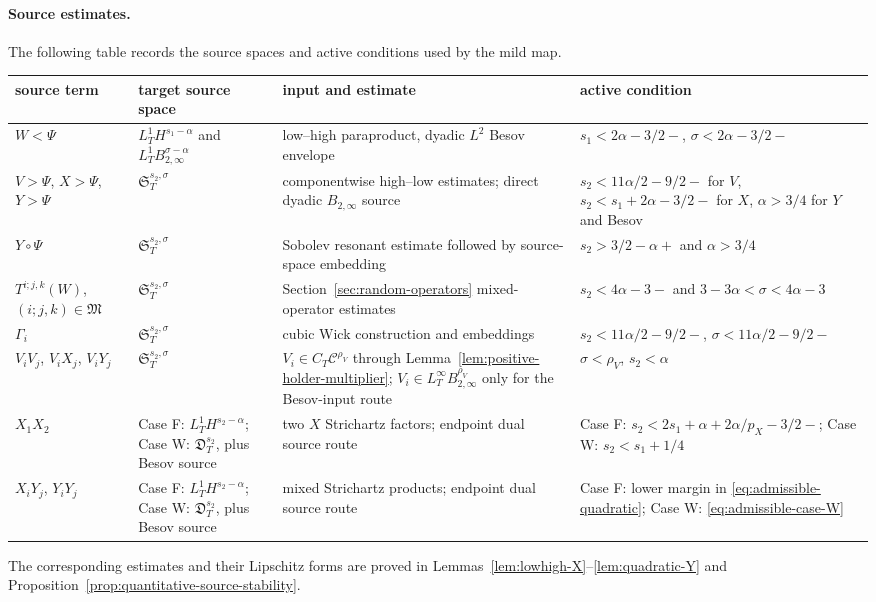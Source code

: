 \documentclass[10pt]{amsart}
\numberwithin{equation}{section}
\theoremstyle{plain}
\theoremstyle{definition}
\theoremstyle{remark}
\newcommand{\C}{\mathcal{C}}
\begin{document}
\paragraph{Source estimates.}
The following table records the source spaces and active conditions used by the mild map.
\begin{center}
\scriptsize
\begin{tabular}{@{}>{\raggedright\arraybackslash}p{}>{\raggedright\arraybackslash}p{}>{\raggedright\arraybackslash}p{}>{\raggedright\arraybackslash}p{}@{}}
\toprule
source term & target source space & input and estimate & active condition \\
\midrule
$W<\Psi$ & $L_T^1H^{s_1-\alpha}$ and $L_T^1B_{2,\infty}^{\sigma-\alpha}$ & low--high paraproduct, dyadic $L^2$ Besov envelope & $s_1<2\alpha-3/2-$, $\sigma<2\alpha-3/2-$ \\
$V>\Psi$, $X>\Psi$, $Y>\Psi$ & $\mathfrak S_T^{s_2,\sigma}$ & componentwise high--low estimates; direct dyadic $B_{2,\infty}$ source & $s_2<11\alpha/2-9/2-$ for $V$, $s_2<s_1+2\alpha-3/2-$ for $X$, $\alpha>3/4$ for $Y$ and Besov \\
$Y\circ\Psi$ & $\mathfrak S_T^{s_2,\sigma}$ & Sobolev resonant estimate followed by source-space embedding & $s_2>3/2-\alpha+$ and $\alpha>3/4$ \\
$T^{i;j,k}(W)$, $(i;j,k)\in\mathfrak M$ & $\mathfrak S_T^{s_2,\sigma}$ & Section~\ref{sec:random-operators} mixed-operator estimates & $s_2<4\alpha-3-$ and $3-3\alpha<\sigma<4\alpha-3$ \\
$\Gamma_i$ & $\mathfrak S_T^{s_2,\sigma}$ & cubic Wick construction and embeddings & $s_2<11\alpha/2-9/2-$, $\sigma<11\alpha/2-9/2-$ \\
$V_iV_j$, $V_iX_j$, $V_iY_j$ & $\mathfrak S_T^{s_2,\sigma}$ & $V_i\in C_T\C^{\rho_V}$ through Lemma~\ref{lem:positive-holder-multiplier}; $V_i\in L_T^\infty B_{2,\infty}^{\rho_V}$ only for the Besov-input route & $\sigma<\rho_V$, $s_2<\alpha$ \\
$X_1X_2$ & Case F: $L_T^1H^{s_2-\alpha}$; Case W: $\mathfrak D_T^{s_2}$, plus Besov source & two $X$ Strichartz factors; endpoint dual source route & Case F: $s_2<2s_1+\alpha+2\alpha/p_X-3/2-$; Case W: $s_2<s_1+1/4$ \\
$X_iY_j$, $Y_iY_j$ & Case F: $L_T^1H^{s_2-\alpha}$; Case W: $\mathfrak D_T^{s_2}$, plus Besov source & mixed Strichartz products; endpoint dual source route & Case F: lower margin in \eqref{eq:admissible-quadratic}; Case W: \eqref{eq:admissible-case-W} \\
\bottomrule
\end{tabular}
\end{center}
The corresponding estimates and their Lipschitz forms are proved in Lemmas~\ref{lem:lowhigh-X}--\ref{lem:quadratic-Y} and Proposition~\ref{prop:quantitative-source-stability}.
\end{document}
